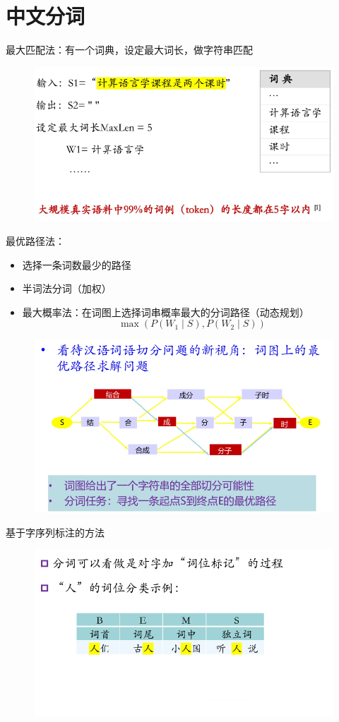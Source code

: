 
\section{中文分词}
最大匹配法：有一个词典，设定最大词长，做字符串匹配
\begin{figure}[H]
\centering
\includegraphics[width=0.8\linewidth]{fig/max_matching.png}
\end{figure}

最优路径法：
\begin{itemize}
\item 选择一条词数最少的路径
\item 半词法分词（加权）
\item 最大概率法：在词图上选择词串概率最大的分词路径（动态规划）
\[\max(P(W_1\mid S),P(W_2\mid S))\]
\end{itemize}
\begin{figure}[H]
\centering
\includegraphics[width=0.8\linewidth]{fig/best_path.png}
\end{figure}

基于字序列标注的方法
\begin{figure}[H]
\centering
\includegraphics[width=0.8\linewidth]{fig/word_pos_labeling.png}
\end{figure}